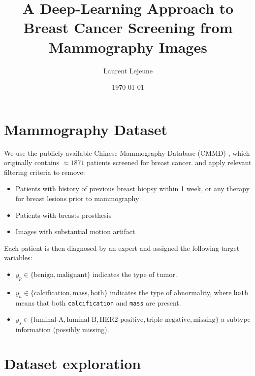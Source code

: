 \documentclass[11pt]{article}
\author{Laurent Lejeune}
\date{\today}
\title{A Deep-Learning Approach to Breast Cancer Screening from Mammography Images}
\begin{document}
\maketitle
\tableofcontents


\section{Mammography Dataset}
\label{sec:orgc746c8a}

We use the publicly available Chinese Mammography Database (CMMD) \autocite{cai23},
which originally contains \(\approx 1871\) patients screened for breast cancer.
and apply relevant filtering criteria to remove:
\begin{itemize}
\item Patients with history of previous breast biopsy within 1 week, or any therapy for breast lesions
prior to mammography
\item Patients with breasts prosthesis
\item Images with substantial motion artifact
\end{itemize}

Each patient is then diagnosed by an expert and assigned the following target variables:
\begin{itemize}
\item \(y_{p} \in \{\text{benign}, \text{malignant}\}\) indicates the type of tumor.
\item \(y_{a} \in \{\text{calcification}, \text{mass}, \text{both}\}\) indicates the type of abnormality, where \texttt{both} means that both \texttt{calcification} and \texttt{mass} are present.
\item \(y_s \in \{\text{luminal-A}, \text{luminal-B},\text{HER2-positive},\text{triple-negative},\text{missing}\}\) a
subtype information (possibly missing).
\end{itemize}



\section{Dataset exploration}
\label{sec:orgfbd253f}

\printbibliography
\end{document}
